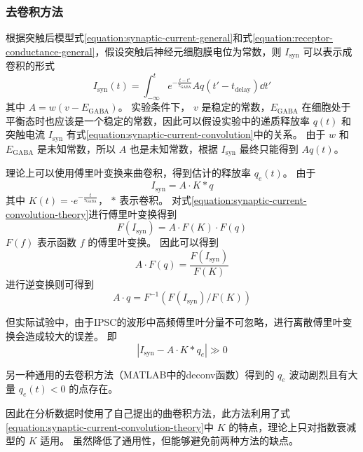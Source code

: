 \subsubsection{去卷积方法}
根据突触后模型式\ref{equation:synaptic-current-general}和式\ref{equation:receptor-conductance-general}，假设突触后神经元细胞膜电位为常数，则 $I_\text{syn}$ 可以表示成卷积的形式
\begin{equation}
I_\text{syn}(t) = \int_{-\infty}^t e^{-\frac{t - t'}{\tau_\text{GABA}}} A q(t' - t_\text{delay}) \dd{t'}
\label{equation:synaptic-current-convolution}
\end{equation}
其中 $A = w(v - E_\text{GABA})$。
实验条件下， $v$ 是稳定的常数，$E_\text{GABA}$ 在细胞处于平衡态时也应该是一个稳定的常数，因此可以假设实验中的递质释放率 $q(t)$ 和 突触电流 $I_\text{syn}$ 有式\ref{equation:synaptic-current-convolution}中的关系。
由于 $w$ 和 $E_\text{GABA}$ 是未知常数，所以 $A$ 也是未知常数，根据 $I_\text{syn}$ 最终只能得到 $Aq(t)$。

理论上可以使用傅里叶变换来曲卷积，得到估计的释放率 $q_e(t)$。
由于
\begin{equation}
I_\text{syn} = A \cdot K * q
\label{equation:synaptic-current-convolution-theory}
\end{equation}
其中 $K(t) = \cdot e^{-\frac{t}{\tau_\text{GABA}}}$， $*$ 表示卷积。
对式\ref{equation:synaptic-current-convolution-theory}进行傅里叶变换得到
\begin{equation}
F(I_\text{syn}) = A \cdot F(K) \cdot F(q)
\label{equation:synaptic-current-fourier-transformation}
\end{equation}
$F(f)$ 表示函数 $f$ 的傅里叶变换。
因此可以得到
\begin{equation}
A \cdot F(q) = \frac{F(I_\text{syn})}{F(K)}
\label{equation:release-rate-fourier}
\end{equation}
进行逆变换则可得到
\begin{equation}
A \cdot q = F^{-1}\left( F(I_\text{syn}) / F(K) \right)
\end{equation}

但实际试验中，由于IPSC的波形中高频傅里叶分量不可忽略，进行离散傅里叶变换会造成较大的误差。
即
\begin{equation}
\left| I_\text{syn} - A \cdot K * q_e \right| \gg 0
\label{equation:deconvolution-error}
\end{equation}

另一种通用的去卷积方法（MATLAB中的deconv函数）得到的 $q_e$ 波动剧烈且有大量 $q_e(t) < 0$ 的点存在。

因此在分析数据时使用了自己提出的曲卷积方法，此方法利用了式\ref{equation:synaptic-current-convolution-theory}中 $K$ 的特点，理论上只对指数衰减型的 $K$ 适用。
虽然降低了通用性，但能够避免前两种方法的缺点。

